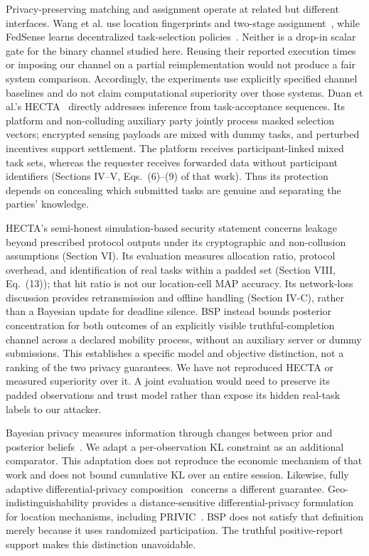 \documentclass[3p,times]{elsarticle}
\begin{document}
Privacy-preserving matching and assignment operate at related but different interfaces. Wang et al. use location fingerprints and two-stage assignment~\cite{fingerprint}, while FedSense learns decentralized task-selection policies~\cite{fedsense2025}. Neither is a drop-in scalar gate for the binary channel studied here. Reusing their reported execution times or imposing our channel on a partial reimplementation would not produce a fair system comparison. Accordingly, the experiments use explicitly specified channel baselines and do not claim computational superiority over those systems. Duan et al.'s HECTA~\cite{inference2026} directly addresses inference from task-acceptance sequences. Its platform and non-colluding auxiliary party jointly process masked selection vectors; encrypted sensing payloads are mixed with dummy tasks, and perturbed incentives support settlement. The platform receives participant-linked mixed task sets, whereas the requester receives forwarded data without participant identifiers (Sections IV--V, Eqs.~(6)--(9) of that work). Thus its protection depends on concealing which submitted tasks are genuine and separating the parties' knowledge.

HECTA's semi-honest simulation-based security statement concerns leakage beyond prescribed protocol outputs under its cryptographic and non-collusion assumptions (Section VI). Its evaluation measures allocation ratio, protocol overhead, and identification of real tasks within a padded set (Section VIII, Eq.~(13)); that hit ratio is not our location-cell MAP accuracy. Its network-loss discussion provides retransmission and offline handling (Section IV-C), rather than a Bayesian update for deadline silence. BSP instead bounds posterior concentration for both outcomes of an explicitly visible truthful-completion channel across a declared mobility process, without an auxiliary server or dummy submissions. This establishes a specific model and objective distinction, not a ranking of the two privacy guarantees. We have not reproduced HECTA or measured superiority over it. A joint evaluation would need to preserve its padded observations and trust model rather than expose its hidden real-task labels to our attacker.

Bayesian privacy measures information through changes between prior and posterior beliefs~\cite{bayesian}. We adapt a per-observation KL constraint as an additional comparator. This adaptation does not reproduce the economic mechanism of that work and does not bound cumulative KL over an entire session. Likewise, fully adaptive differential-privacy composition~\cite{adaptive2023} concerns a different guarantee. Geo-indistinguishability provides a distance-sensitive differential-privacy formulation for location mechanisms, including PRIVIC~\cite{privic2024}. BSP does not satisfy that definition merely because it uses randomized participation. The truthful positive-report support makes this distinction unavoidable.
\end{document}

